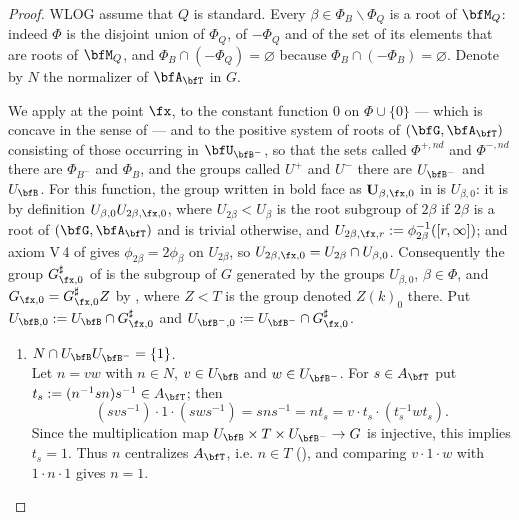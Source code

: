 \documentclass[12pt,a4paper]{amsart}%
\newcommand{\RamiB}[1]{{{#1}}}
\newcommand{\RamiC}[1]{{{#1}}}
\newcommand{\DimaB}[1]{{{#1}}}
\begin{document}
\begin{proof}
\RamiB{WLOG assume that $Q$ is standard}. Every $\beta\in
\Phi_B\smallsetminus\Phi_Q$ is a root of $\bfM_Q$: indeed $\Phi$ is the disjoint union of
$\Phi_Q$, of $-\Phi_Q$ and of the set of its elements that are roots of $\bfM_Q$, and
$\Phi_B\cap(-\Phi_Q)=\varnothing$ because $\Phi_B\cap(-\Phi_B)=\varnothing$. Denote by
$N$ the normalizer of $\bfA_\bfT$ in $G$.

We apply \cite[Proposition 7.3.12]{KP} at the point $\fx$, to the constant function $0$ on
$\Phi\cup\{0\}$ --- which is concave in the sense of \cite[Definition 7.3.1]{KP} --- and to the
positive system of roots of $(\bfG,\bfA_\bfT)$ consisting of those occurring in
$\bfU_{\bfB^-}$, so that the sets called $\Phi^{+,nd}$ and $\Phi^{-,nd}$ there are
$\Phi_{B^-}$ and $\Phi_B$, and the groups called $U^+$ and $U^-$ there are $U_{\bfB^-}$
and $U_\bfB$. For this function, the group written in bold face as $\mathbf{U}_{\beta,\fx,0}$ in
\cite[Definition 7.3.3(1)]{KP} is $U_{\beta,0}$: it is by definition
$U_{\beta,0}U_{2\beta,\fx,0}$, where $U_{2\beta}<U_\beta$ is the root subgroup of $2\beta$ if
$2\beta$ is a root of $(\bfG,\bfA_\bfT)$ and is trivial otherwise, and
$U_{2\beta,\fx,r}:=\phi_{2\beta}^{-1}([r,\infty])$; and axiom V\,4 of
\cite[Definition 6.1.2]{KP} gives $\phi_{2\beta}=2\phi_\beta$ on $U_{2\beta}$, so
$U_{2\beta,\fx,0}=U_{2\beta}\cap U_{\beta,0}$. Consequently the group $G^\sharp_{\fx,0}$ of
\cite[Definition 7.3.3(2)]{KP} is the subgroup of $G$ generated by the groups $U_{\beta,0}$,
$\beta\in\Phi$, and $G_{\RamiC{\fx,}0}=G^\sharp_{\fx,0}Z$ by \cite[Definition 7.3.3(3)]{KP}, where $Z<T$ is
the group denoted $Z(k)_0$ there. Put $U_{\bfB,0}:=U_\bfB\cap G^\sharp_{\fx,0}$ and
$U_{\bfB^-,0}:=U_{\bfB^-}\cap G^\sharp_{\fx,0}$.
\begin{enumerate}[Step 1.]
    \item 
$N\cap U_\bfB U_{\bfB^-}=\{1\}$.\\
\DimaB{Let}
$n=vw$ with $n\in N$, $v\in U_\bfB$ and $w\in U_{\bfB^-}$. For $s\in A_\bfT$ put
$t_s:=(n^{-1}sn)s^{-1}\in A_\bfT$; then
$$
(svs^{-1})\cdot 1\cdot (sws^{-1})=sns^{-1}=nt_s=v\cdot t_s\cdot (t_s^{-1}wt_s)\RamiC{.}
$$
\DimaB{Since the multiplication map $U_\bfB\times T\times
U_{\bfB^-}\to G$ is injective, this implies
$t_s=1$}. Thus $n$ centralizes $A_\bfT$, i.e. $n\in T$
(\cite[V.4.1]{Ren}), and comparing $v\cdot 1\cdot w$ with $1\cdot n\cdot 1$ gives $n=1$.


\end{enumerate}
\end{proof}
\end{document}

